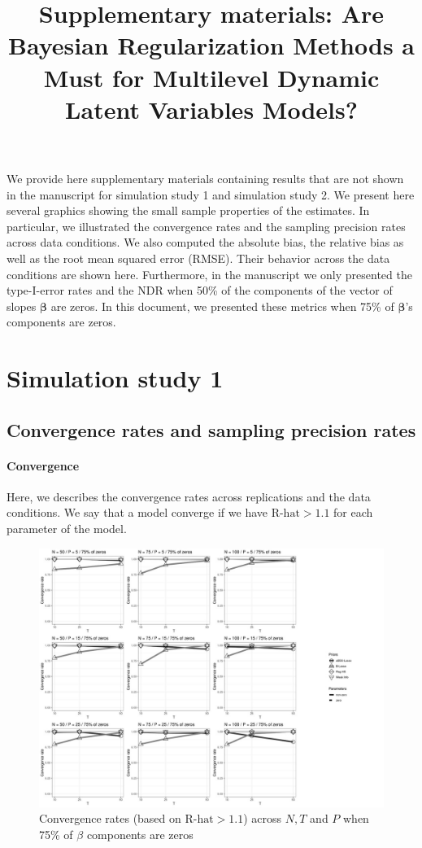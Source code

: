 \documentclass[a4paper,12pt]{article}
\title{Supplementary materials: Are Bayesian Regularization Methods a Must for Multilevel Dynamic Latent Variables Models?}
\author{}
\date{}
\begin{document}
\maketitle

We provide here supplementary materials containing results that are not shown in the manuscript for simulation study 1 and simulation study 2. We present here several graphics showing the small sample properties of the estimates. In particular, we illustrated the convergence rates and the sampling precision rates across data conditions. We also computed the absolute bias, the relative bias as well as the root mean squared error (RMSE). Their behavior across the data conditions are shown here. Furthermore, in the manuscript we only presented the type-I-error rates and the NDR when 50\% of the components of the vector of slopes $\pmb{\beta}$ are zeros. In this document, we presented these metrics when 75\% of $\pmb{\beta}$'s components are zeros.

\section{Simulation study 1}

\subsection*{Convergence rates and sampling precision rates}
\paragraph{Convergence}
Here, we describes the convergence rates across replications and the data conditions. We say that a model converge if we have $\text{R-hat}>1.1$ for each parameter of the model. \\
 
\begin{figure}[h]
\centering 
\label{fig:CVr_nz25}
\includegraphics[width=18cm]{CVr_nz25_beta.jpg}
\caption{Convergence rates (based on $\text{R-hat}>1.1$) across $N, T$ and $P$ when 75\% of $\beta$ components are zeros}
\end{figure}
\end{document}

